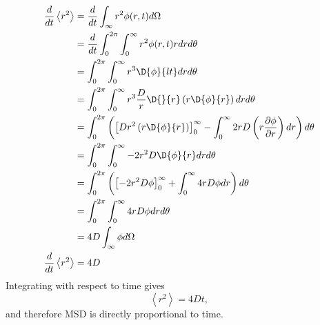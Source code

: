 \begin{equation}
\begin{split}
\frac{d}{dt} \left<r^2\right> &= \frac{d}{dt}\int_{\infty}r^2 \phi(r,t) d\Omega \\
                            &= \frac{d}{dt} \int_0^{2\pi}\int_0^{\infty} r^2 \phi(r,t) r dr d\theta \\
                           &= \int_0^{2\pi} \int_0^{\infty} r^3 \D{\phi}{l t} dr d\theta \\
                            &= \int_0^{2\pi} \int_0^{\infty} r^3 \frac{D}{r} \D{}{r } \left( r \D{ \phi}{ r}\right) dr d\theta \\
                            &= \int_0^{2\pi} \left( \left[ D r^2 \left( r \D{ \phi}{ r}\right) \right]_0^{\infty} - \int_0^{\infty} 2rD \left(r \frac{\partial \phi}{\partial r} \right) dr \right) d\theta \\
                            &= \int_0^{2\pi} \int_0^{\infty} -2r^2D \D{ \phi}{r}dr d\theta \\
                            &= \int_0^{2\pi} \left( \left[-2r^2D \phi \right]_0^{\infty} + \int_0^{\infty} 4rD \phi dr \right)d\theta \\
                            &= \int_0^{2\pi} \int_0^{\infty} 4rD\phi dr d\theta \\
                            &= 4D \int_{\infty} \phi d\Omega \\
\frac{d}{dt} \left<r^2\right>  &= 4D \\
\label{eqn:diffusion_1}
\end{split}
\end{equation}
%
Integrating with respect to time gives
%
\begin{equation}
\left<r^2\right> = 4Dt ,
\label{eqn:D_msd}
\end{equation}
%
and therefore MSD is directly proportional to time.
%

